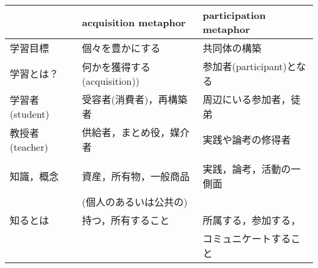 \documentclass[a4j,twocolumn]{jsarticle}
\begin{document}
\begin{center}
\begin{tabular}{lll}
 & acquisition metaphor & participation metaphor\\
\hline
学習目標 & 個々を豊かにする & 共同体の構築\\
\hline
学習とは？ & 何かを獲得する(acquisition)) & 参加者(participant)となる\\
\hline
学習者(student) & 受容者(消費者)，再構築者　 & 周辺にいる参加者，徒弟\\
\hline
教授者(teacher) & 供給者，まとめ役，媒介者 & 実践や論考の修得者\\
 &  & \\
\hline
知識，概念 & 資産，所有物，一般商品 & 実践，論考，活動の一側面\\
 & (個人のあるいは公共の) & \\
\hline
知るとは & 持つ，所有すること & 所属する，参加する，\\
 &  & コミュニケートすること\\
\hline
\end{tabular}
\end{center}


\end{document}
